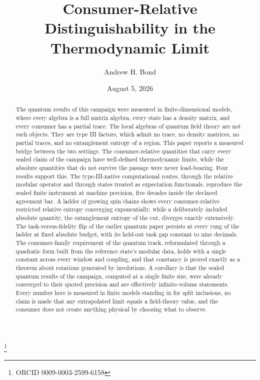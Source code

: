 \documentclass[aps,prd,reprint,nofootinbib,longbibliography]{revtex4-2}
\begin{document}
\title{Consumer-Relative Distinguishability in the Thermodynamic Limit}

\author{Andrew H. Bond}
\thanks{ORCID 0009-0003-2599-6158}
\date{August 5, 2026}

\begin{abstract}
The quantum results of this campaign were measured in finite-dimensional
models, where every algebra is a full matrix algebra, every state has a
density matrix, and every consumer has a partial trace.  The local algebras
of quantum field theory are not such objects.  They are type III factors,
which admit no trace, no density matrices, no partial traces, and no
entanglement entropy of a region.  This paper reports a measured bridge
between the two settings.  The consumer-relative quantities that carry
every sealed claim of the campaign have well-defined thermodynamic limits,
while the absolute quantities that do not survive the passage were never
load-bearing.  Four results support this.  The type-III-native
computational routes, through the relative modular operator and through
states treated as expectation functionals, reproduce the sealed finite
instrument at machine precision, five decades inside the declared agreement
bar.  A ladder of growing spin chains shows every consumer-relative
restricted relative entropy converging exponentially, while a deliberately
included absolute quantity, the entanglement entropy of the cut, diverges
exactly extensively.  The task-versus-fidelity flip of the earlier quantum
paper persists at every rung of the ladder at fixed absolute budget, with
its held-out task gap constant to nine decimals.  The consumer-family
requirement of the quantum track, reformulated through a quadratic form
built from the reference state's modular data, holds with a single
constant across every window and coupling, and that constancy is proved
exactly as a theorem about rotations generated by involutions.  A
corollary is that the
sealed quantum results of the campaign, computed at a single finite size,
were already converged to their quoted precision and are effectively
infinite-volume statements.  Every number here is measured in finite
models standing in for split inclusions, no claim is made that any
extrapolated limit equals a field-theory value, and the consumer does not
create anything physical by choosing what to observe.
\end{abstract}

\maketitle
\end{document}
